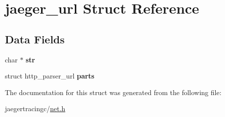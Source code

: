 \hypertarget{structjaeger__url}{}\section{jaeger\+\_\+url Struct Reference}
\label{structjaeger__url}
\subsection*{Data Fields}
\begin{DoxyCompactItemize}
\item 
\mbox{\label{structjaeger__url_ac5b9682a87171c2a3ae1436c87f6f7ae}} 
char $\ast$ {\bfseries str}
\item 
\mbox{\label{structjaeger__url_a4a23047f8c55abe2757c3f251cb62991}} 
struct http\+\_\+parser\+\_\+url {\bfseries parts}
\end{DoxyCompactItemize}


The documentation for this struct was generated from the following file\+:\begin{DoxyCompactItemize}
\item 
jaegertracingc/\mbox{\hyperlink{net_8h}{net.\+h}}\end{DoxyCompactItemize}
